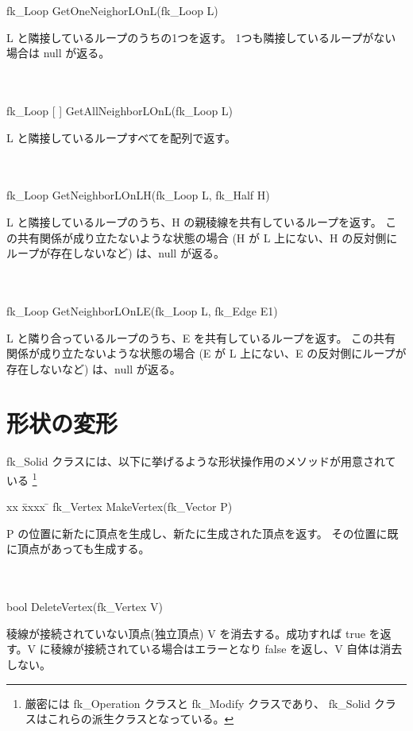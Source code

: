 \begin{tabbing}
 \> fk\_Loop GetOneNeighorLOnL(fk\_Loop L) \\
	\> \> \begin{minipage}[]{15cm}
		L と隣接しているループのうちの1つを返す。
		1つも隣接しているループがない場合は null が返る。
	\end{minipage} \\ \\

 \> fk\_Loop [ ] GetAllNeighborLOnL(fk\_Loop L) \\
	\> \> \begin{minipage}[]{15cm}
		L と隣接しているループすべてを配列で返す。
	\end{minipage} \\ \\

 \> fk\_Loop GetNeighborLOnLH(fk\_Loop L, fk\_Half H) \\
	\> \> \begin{minipage}[]{15cm}
		L と隣接しているループのうち、H の親稜線を共有しているループを返す。
		この共有関係が成り立たないような状態の場合
		(H が L 上にない、H の反対側にループが存在しないなど) は、null が返る。
	\end{minipage} \\ \\

 \> fk\_Loop GetNeighborLOnLE(fk\_Loop L, fk\_Edge E1) \\
	\> \> \begin{minipage}[]{15cm}
		L と隣り合っているループのうち、E を共有しているループを返す。
		この共有関係が成り立たないような状態の場合
		(E が L 上にない、E の反対側にループが存在しないなど) は、null が返る。
	\end{minipage}
\end{tabbing}

\section{形状の変形} \label{sec:ModifySolid}
fk\_Solid クラスには、以下に挙げるような形状操作用のメソッドが用意されている
\footnote{厳密には fk\_Operation クラスと fk\_Modify クラスであり、
fk\_Solid クラスはこれらの派生クラスとなっている。}
\begin{tabbing}
xx \= xxxx \= \kill
 \> fk\_Vertex MakeVertex(fk\_Vector P) \\
	\> \> \begin{minipage}[]{15cm}
		P の位置に新たに頂点を生成し、新たに生成された頂点を返す。
		その位置に既に頂点があっても生成する。
	\end{minipage} \\ \\

 \> bool DeleteVertex(fk\_Vertex V) \\
	\> \> \begin{minipage}[]{15cm}
	   	稜線が接続されていない頂点(独立頂点) V を消去する。成功すれば
		true を返す。V に稜線が接続されている場合はエラーとなり false
		を返し、V 自体は消去しない。
	\end{minipage}
\end{tabbing}

